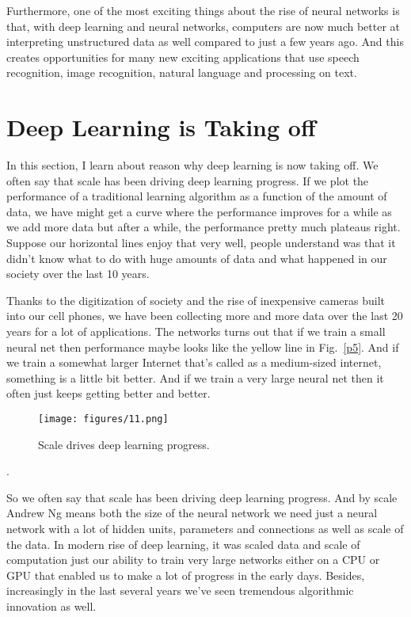 \documentclass[a4paper]{article}
\begin{document}
Furthermore, one of the most exciting things about the rise of neural networks is that, with deep learning and neural networks, computers are now much better at interpreting unstructured data as well compared to just a few years ago.  And this creates opportunities for many new exciting applications that use speech recognition, image recognition, natural language and processing on text.

\section{Deep Learning is Taking off}

In this section, I learn about reason why deep learning is now taking off. We often say that scale has been driving deep learning progress. If we plot the performance of a traditional learning algorithm as a function of the amount of data, we have might get a curve where the performance improves for a while as we add more data but after a while, the performance pretty much plateaus right. Suppose our horizontal lines enjoy that very well, people understand was that it didn't know what to do with huge amounts of data and what happened in our society over the last 10 years.

Thanks to the digitization of society and the rise of inexpensive cameras built into our cell phones, we have been collecting more and more data over the last 20 years for a lot of applications. The networks turns out that if we train a small neural net then performance maybe looks like the yellow line in Fig.~\ref{p5}. And if we train a somewhat larger Internet that's called as a medium-sized internet, something is a little bit better. And if we train a very large neural net then it often just keeps getting better and better.
\begin{figure}[b]
	\begin{center}
		\texttt{[image: figures/11.png]}
	\end{center}
	\caption{Scale drives deep learning progress.}
	\label{p6}
\end{figure}.

So we often say that scale has been driving deep learning progress. And by scale Andrew Ng means both the size of the neural network we need just a neural network with a lot of hidden units, parameters and connections as well as scale of the data. In modern rise of deep learning, it was scaled data and scale of computation just our ability to train very large networks either on a CPU or GPU that enabled us to make a lot of progress in the early days. Besides, increasingly in the last several years we've seen tremendous algorithmic innovation as well. 
\end{document}
